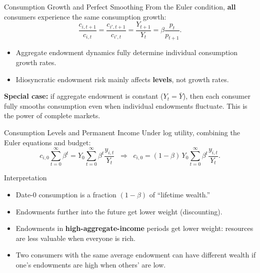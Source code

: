 \documentclass[aspectratio=169,10pt]{beamer}
\newcommand{\apxbutton}[1]{\hfill\hyperlink{#1}{\beamerbutton{Appendix}}}
\begin{document}
\begin{frame}{Consumption Growth and Perfect Smoothing}
From the Euler condition, \textbf{all} consumers experience the same consumption growth:
\[
\frac{c_{i,t+1}}{c_{i,t}}
=
\frac{c_{i',t+1}}{c_{i',t}}
=
\frac{Y_{t+1}}{Y_t}
=
\beta \frac{p_t}{p_{t+1}}.
\]

\begin{itemize}
  \item Aggregate endowment dynamics fully determine individual consumption growth rates.
  \item Idiosyncratic endowment risk mainly affects \textbf{levels}, not growth rates.
\end{itemize}

\medskip
\textbf{Special case:} if aggregate endowment is constant ($Y_t=\bar{Y}$), then each consumer fully smooths consumption even when individual endowments fluctuate. This is the power of complete markets.
\end{frame}

\begin{frame}{Consumption Levels and Permanent Income}
\hypertarget{m-a13}{}
Under log utility, combining the Euler equations and budget:
\[
c_{i,0} \sum_{t=0}^{\infty}\beta^t = Y_0 \sum_{t=0}^{\infty}\beta^t \frac{y_{i,t}}{Y_t}
\;\;\Rightarrow\;\;
\boxed{c_{i,0} = (1-\beta)\,Y_0 \sum_{t=0}^{\infty}\beta^t \frac{y_{i,t}}{Y_t}.}
\]

\begin{block}{Interpretation}
\begin{itemize}
  \item Date-0 consumption is a fraction $(1-\beta)$ of ``lifetime wealth.''
  \item Endowments further into the future get lower weight (discounting).
  \item Endowments in \textbf{high-aggregate-income} periods get lower weight: resources are less valuable when everyone is rich.
  \item Two consumers with the same average endowment can have different wealth if one's endowments are high when others' are low.
\end{itemize}
\end{block}
\apxbutton{a13}
\end{frame}
\end{document}
